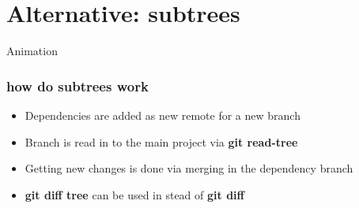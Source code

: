 \section{Alternative: subtrees}
\begin{frame}{Animation}
\frametitle{how do subtrees work}
	\begin{itemize}[<+- | alert@+>]
		\item Dependencies are added as new remote for a new branch
		\item Branch is read in to the main project via \textbf{git read-tree}
		\item Getting new changes is done via merging in the dependency branch
		\item \textbf{git diff tree} can be used in stead of \textbf{git diff}
	\end{itemize}

\end{frame}	
